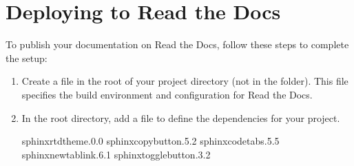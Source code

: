 \documentclass[a4paper,10pt,english]{sphinxmanual}
\begin{document}
\section{Deploying to Read the Docs}
\label{\detokenize{page_three:deploying-to-read-the-docs}}\label{\detokenize{page_three::doc}}
\sphinxAtStartPar
To publish your documentation on Read the Docs, follow these steps to complete the setup:
\begin{enumerate}
%
\item {} 
\sphinxAtStartPar
{}

\sphinxAtStartPar
Create a  file in the root of your project directory (not in the  folder). This file specifies the build environment and configuration for Read the Docs.

\begin{sphinxVerbatim}[commandchars=\\\{\}]




\end{sphinxVerbatim}

\item {} 
\sphinxAtStartPar
{}

\sphinxAtStartPar
In the root directory, add a  file to define the dependencies for your project.

\begin{sphinxVerbatim}[commandchars=\\\{\}]
sphinx\PYGZhy{}rtd\PYGZhy{}theme.0.0
sphinx\PYGZhy{}copybutton.5.2
sphinx\PYGZhy{}code\PYGZhy{}tabs.5.5
sphinx\PYGZhy{}new\PYGZhy{}tab\PYGZhy{}link.6.1
sphinx\PYGZhy{}togglebutton.3.2
\end{sphinxVerbatim}


\end{enumerate}
\end{document}
